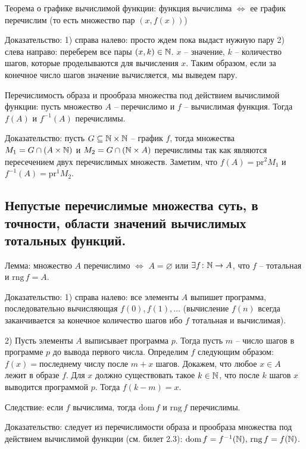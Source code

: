 \documentclass[a4paper, 10pt]{article}
\newcommand{\dom}{\text{dom}\,}
\newcommand{\rng}{\text{rng}\,}
\begin{document}
Теорема о графике вычислимой функции: функция вычислима $\iff$ ее график перечислим (то есть множество пар $(x,f(x))$)

Доказательство: 1) справа налево: просто ждем пока выдаст нужную пару
2) слева направо: переберем все пары $(x,k)\in\mathbb{N}$. $x$ -- значение, $k$ -- количество шагов, которые проделываются для вычисления $x$. Таким образом, если за конечное число шагов значение вычисляется, мы выведем пару.

\hfill

Перечислимость образа и прообраза множества под действием вычислимой функции: пусть множество $A$ -- перечислимо и $f$ -- вычислимая функция. Тогда $f(A)$ и $f^{-1}(A)$ перечислимы.

Доказательство: пусть $G\subseteq\mathbb{N}\times\mathbb{N}$ -- график $f$, тогда множества $M_1=G\cap(A\times\mathbb{N})$ и $M_2=G\cap(\mathbb{N}\times A)$ перечислимы так как являются пересечением двух перечислимых множеств. Заметим, что $f(A)=\text{pr}^2 M_1$ и $f^{-1}(A)=\text{pr}^1 M_2$.

\subsection{Непустые перечислимые множества суть, в точности, области значений вычислимых тотальных функций.}

Лемма: множество $A$ перечислимо $\iff$ $A=\varnothing$ или $\exists f\colon \mathbb{N}\to A$, что $f$ -- тотальная и $\text{rng}\, f=A$.

Доказательство: 1) справа налево: все элементы $A$ выпишет программа, последовательно вычисляющая $f(0),f(1),\ldots$ (вычисление $f(n)$ всегда заканчивается за конечное количество шагов ибо $f$ тотальная и вычислимая).

2) Пусть элементы $A$ выписывает программа $p$. Тогда пусть $m$ -- число шагов в программе $p$ до вывода первого числа. Определим $f$ следующим образом: $f(x)=$последнему числу после $m+x$ шагов. Докажем, что любое $x\in A$ лежит в образе $f$. Для $x$ должно существовать такое $k\in\mathbb{N}$, что после $k$ шагов $x$ выводится программой $p$. Тогда $f(k-m)=x$.

\hfill

Следствие: если $f$ вычислима, тогда $\dom f$ и $\rng f$ перечислимы.

Доказательство: следует из перечислимости образа и прообраза множества под действием вычислимой функции (см. билет 2.3): $\dom f=f^{-1}(\N),\,\rng f=f(\N)$.
\end{document}
